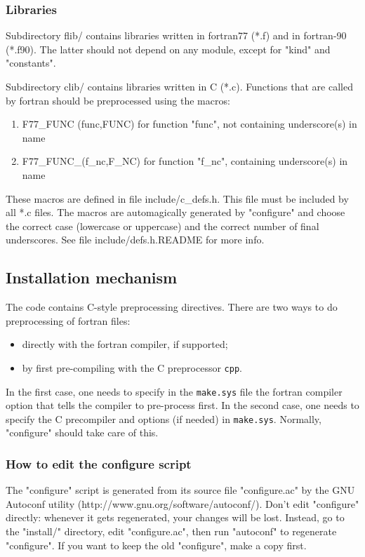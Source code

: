 \documentclass[12pt,a4paper]{article}
\begin{document}
\subsubsection{ Libraries}

Subdirectory flib/ contains libraries written in fortran77 (*.f) and in 
fortran-90 (*.f90).
The latter should not depend on any module, except for "kind" and "constants".

Subdirectory clib/ contains libraries written in C (*.c). 
Functions that are called by fortran
should be preprocessed using the macros:
\begin{enumerate}
\item F77\_FUNC (func,FUNC) for function "func", not containing underscore(s) in name 
\item F77\_FUNC\_(f\_nc,F\_NC) for function "f\_nc", containing underscore(s) in name
\end{enumerate}
These macros are defined in file include/c\_defs.h. This file must be included
by all *.c files. The macros are automagically generated by "configure" and 
choose the correct case 
(lowercase or uppercase) and the correct number of final underscores. 
See file include/defs.h.README for more info.

\subsection{Installation mechanism}

The code contains C-style preprocessing directives. There are two ways to do preprocessing of fortran files:
\begin{itemize}
\item directly with the fortran compiler, if supported;
\item by first pre-compiling with the C preprocessor \texttt{cpp}.
\end{itemize}

In the first case, one needs to specify in the \texttt{make.sys} file the fortran compiler option that tells the compiler to pre-process first. In the second case, one needs to
specify the C precompiler and options (if needed) in \texttt{make.sys}.
Normally, "configure" should take care of this.


\subsubsection{ How to edit the configure script}

The "configure" script is generated from its source file
"configure.ac" by the GNU Autoconf utility
(http://www.gnu.org/software/autoconf/).  Don't edit "configure"
directly: whenever it gets regenerated, your changes will be lost.
Instead, go to the "install/" directory, edit "configure.ac", 
then run "autoconf" to regenerate "configure". If you want 
to keep the old "configure", make a copy
first.
\end{document}
